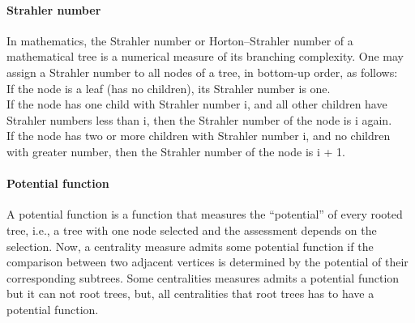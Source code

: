 
\paragraph{Strahler number} In mathematics, the Strahler number or Horton–Strahler number of a mathematical tree is a numerical measure of its branching complexity. One may assign a Strahler number to all nodes of a tree, in bottom-up order, as follows:\\
If the node is a leaf (has no children), its Strahler number is one.\\
If the node has one child with Strahler number i, and all other children have Strahler numbers less than i, then the Strahler number of the node is i again.\\
If the node has two or more children with Strahler number i, and no children with greater number, then the Strahler number of the node is i + 1.

\paragraph{Potential function} A potential function is a function that measures the “potential” of every rooted tree, i.e.,
a tree with one node selected and the assessment depends on the selection. Now, a centrality measure admits some potential function if the comparison between two adjacent vertices is determined by the potential of their corresponding subtrees. Some centralities measures admits a potential function but it can not root trees, but, all centralities that root trees has to have a potential function.

